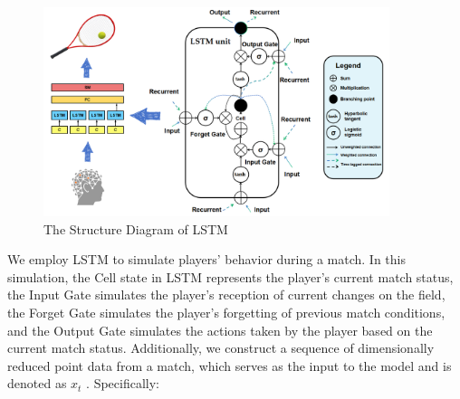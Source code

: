 \begin{figure}[htbp]
    \centering
    \includegraphics[width=0.9\textwidth]{figure/lstm_structure.png}
    \caption{The Structure Diagram of LSTM
    \textnormal{}}
    \label{fig:lstm_struction}
\end{figure}

We employ LSTM to simulate players' behavior during a match. In this simulation, the Cell state in LSTM represents the player's current match status, the Input Gate simulates the player's reception of current changes on the field, the Forget Gate simulates the player's forgetting of previous match conditions, and the Output Gate simulates the actions taken by the player based on the current match status. Additionally, we construct a sequence of dimensionally reduced point data from a match, which serves as the input to the model and is denoted as $x_t$ . Specifically:


